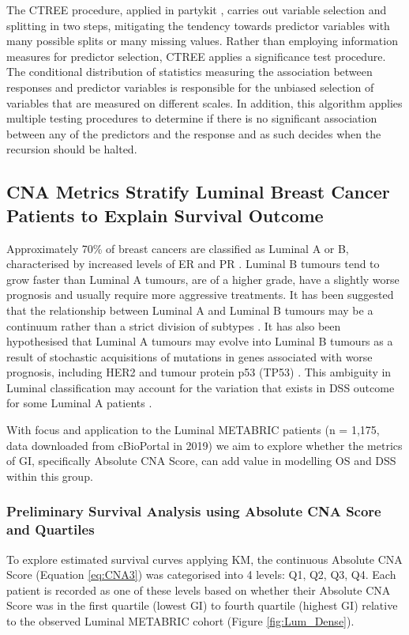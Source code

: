The CTREE procedure, applied in partykit \citep{hothorn_hornik_zeileis_2006, ctree1}, carries out variable selection and splitting in two steps, mitigating the tendency towards predictor variables with many possible splits or many missing values. Rather than employing information measures for predictor selection, CTREE applies a significance test procedure. The conditional distribution of statistics measuring the association between responses and predictor variables is responsible for the unbiased selection of variables that are measured on different scales. In addition, this algorithm applies multiple testing procedures to determine if there is no significant association between any of the predictors and the response and as such decides when the recursion should be halted. 

\subsection{CNA Metrics Stratify Luminal Breast Cancer Patients to Explain Survival Outcome}
Approximately 70\% of breast cancers are classified as Luminal A or B, characterised by increased levels of ER and PR \citep{pmid27341628}. Luminal B tumours tend to grow faster than Luminal A tumours, are of a higher grade, have a slightly worse prognosis and usually require more aggressive treatments. It has been suggested that the relationship between Luminal A and Luminal B tumours may be a continuum rather than a strict division of subtypes \citep{pmid18662380, pmid22522925, pmid27341628}. It has also been hypothesised that Luminal A tumours may evolve into Luminal B tumours as a result of stochastic acquisitions of mutations in genes associated with worse prognosis, including HER2 and tumour protein p53 (TP53) \citep{PfefferUlrich2013CGMc}. This ambiguity in Luminal classification may account for the variation that exists in DSS outcome for some Luminal A patients \citep{pmid27341628, pmid26679376, pmid30849944, pmid37253056}.

With focus and application to the Luminal METABRIC patients (n = 1,175, data downloaded from cBioPortal in 2019) we aim to explore whether the metrics of GI, specifically Absolute CNA Score, can add value in modelling OS and DSS within this group. 

\subsubsection{Preliminary Survival Analysis using Absolute CNA Score and Quartiles}
To explore estimated survival curves applying KM, the continuous Absolute CNA Score (Equation \ref{eq:CNA3}) was categorised into 4 levels: Q1, Q2, Q3, Q4. Each patient is recorded as one of these levels based on whether their Absolute CNA Score was in the first quartile (lowest GI) to fourth quartile (highest GI) relative to the observed Luminal METABRIC cohort (Figure \ref{fig:Lum_Dense}). 

